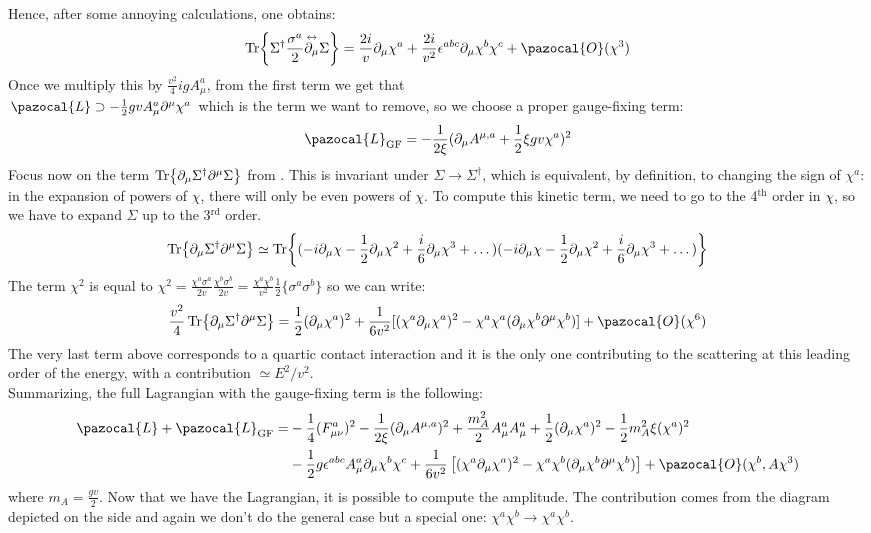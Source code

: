 \documentclass[../main.tex]{subfiles}
\begin{document}
Hence, after some annoying calculations, one obtains:
\[
\Tr{\Sigma^\dagger\frac{\sigma^a}{2}\overset{\leftrightarrow}{\partial_\mu}\Sigma}=\frac{2i}{v}\partial_\mu\chi^a+\frac{2i}{v^2}\epsilon^{abc}\partial_\mu\chi^b\chi^c+\pazocal{O}(\chi^3)
\]
Once we multiply this by $\frac{v^2}{4}igA_\mu^a$, from the first term we get that\\
$\pazocal{L}\supset-\frac{1}{2}gvA_\mu^a\partial^\mu\chi^a$ which is the term we want to remove, so we choose a proper gauge-fixing term:
\[
\pazocal{L}_{\text{GF}}=-\frac{1}{2\xi}(\partial_\mu A^{\mu,a}+\frac{1}{2}\xi gv\chi^a)^2
\]
Focus now on the term $\Tr{\partial_\mu\Sigma^\dagger\partial^\mu\Sigma}$ from . This is invariant under $\Sigma\to\Sigma^\dagger$, which is equivalent, by definition, to changing the sign of $\chi^a$: in the expansion of powers of $\chi$, there will only be even powers of $\chi$. To compute this kinetic term, we need to go to the 4$^\text{th}$ order in $\chi$, so we have to expand $\Sigma$ up to the 3$^\text{rd}$ order.
\[
\Tr{\partial_\mu\Sigma^\dagger\partial^\mu\Sigma}\simeq\Tr{(-i\partial_\mu\chi-\frac{1}{2}\partial_\mu\chi^2+\frac{i}{6}\partial_\mu\chi^3+\dots)(-i\partial_\mu\chi-\frac{1}{2}\partial_\mu\chi^2+\frac{i}{6}\partial_\mu\chi^3+\dots)}
\]
The term $\chi^2$ is equal to $\chi^2=\frac{\chi^a\sigma^a}{2v}\frac{\chi^b\sigma^b}{2v}=\frac{\chi^a\chi^b}{v^2}\frac{1}{2}\{\sigma^a\sigma^b\}$ so we can write:
\[
\frac{v^2}{4}\Tr{\partial_\mu\Sigma^\dagger\partial^\mu\Sigma}=\frac{1}{2}(\partial_\mu\chi^a)^2+\frac{1}{6v^2}[(\chi^a\partial_\mu\chi^a)^2-\chi^a\chi^a(\partial_\mu\chi^b\partial^\mu\chi^b)]+\pazocal{O}(\chi^6)
\]
The very last term above corresponds to a quartic contact interaction and it is the only one contributing to the scattering at this leading order of the energy, with a contribution $\simeq E^2/v^2$.\\
Summarizing, the full Lagrangian with the gauge-fixing term is the following:
\begin{align*}
\pazocal{L}+\pazocal{L}_{\text{GF}}=&-\frac{1}{4}(F_{\mu\nu}^a)^2-\frac{1}{2\xi}(\partial_\mu A^{\mu,a})^2+\frac{m_A^2}{2}A_\mu^aA_\mu^a+\frac{1}{2}(\partial_\mu\chi^a)^2-\frac{1}{2}m_A^2\xi(\chi^a)^2\\
&-\frac{1}{2}g\epsilon^{abc}A_\mu^a\partial_\mu\chi^b\chi^c+\frac{1}{6v^2}\left[(\chi^a\partial_\mu\chi^a)^2-\chi^a\chi^b(\partial_\mu\chi^b\partial^\mu\chi^b)\right]+\pazocal{O}(\chi^b,A\chi^3)
\end{align*}
where $m_A=\frac{gv}{2}$. Now that we have the Lagrangian, it is possible to compute the amplitude. The contribution comes from the diagram depicted on the side and again we don't do the general case but a special one: $\chi^a\chi^b\to\chi^a\chi^b$.
\end{document}
